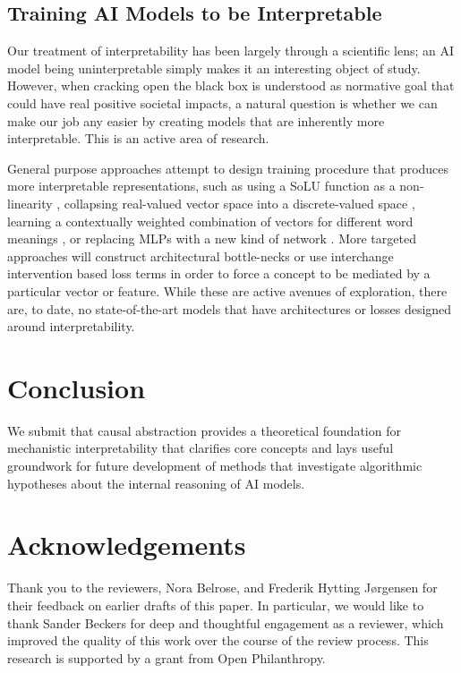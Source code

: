 \documentclass[twoside,11pt]{article}
\begin{document}
\subsection{Training AI Models to be Interpretable}\label{sec:trainingmodels}
Our treatment of interpretability has been largely through a scientific lens; an AI model being uninterpretable simply makes it an interesting object of study. However, when cracking open the black box is understood as normative goal that could have real positive societal impacts, a natural question is whether we can make our job any easier by creating models that are inherently more interpretable. This is an active area of research.

General purpose approaches attempt to design training procedure that produces more interpretable representations, such as using a SoLU function as a non-linearity \citep{elhage2022solu}, collapsing real-valued vector space into a discrete-valued space \citep{tamkin2024codebook}, learning a contextually weighted combination of vectors for different word meanings \citep{Hewitt2023}, or replacing MLPs with a new kind of network \citep{KAN}. More targeted approaches will construct architectural bottle-necks \citep{bottleneck1, bottleneck2, bottleneck3} or use interchange intervention based loss terms \citep{geiger-etal-2021-iit,wu-etal-2021-distill,wu-etal-2022-cpm, huang-etal-2023-inducing, zur-etal-2024-updating} in order to force a concept to be mediated by a particular vector or feature. While these are active avenues of exploration, there are, to date, no state-of-the-art models that have architectures or losses designed around interpretability. 



\section{Conclusion}
We submit that causal abstraction provides a theoretical foundation for mechanistic interpretability that clarifies core concepts and lays useful groundwork for future development of methods that investigate algorithmic hypotheses about the internal reasoning of AI models.

\section*{Acknowledgements}
Thank you to the reviewers, Nora Belrose, and Frederik Hytting J\o rgensen for their feedback on earlier drafts of this paper. In particular, we would like to thank Sander Beckers for deep and thoughtful engagement as a reviewer, which improved the quality of this work over the course of the review process. This research is supported by a grant from Open Philanthropy.











\appendix
\end{document}
